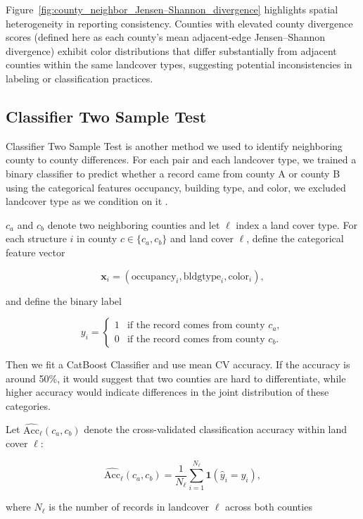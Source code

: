 \documentclass[11pt,letterpaper]{article}
\begin{document}
\noindent


Figure~\ref{fig:county_neighbor_Jensen–Shannon_divergence} highlights spatial heterogeneity in reporting consistency. 
Counties with elevated county divergence scores (defined here as each county's mean adjacent-edge Jensen–Shannon divergence) exhibit color distributions that differ substantially from adjacent counties within the same landcover types, suggesting potential inconsistencies 
in labeling or classification practices.

\subsection{Classifier Two Sample Test}

Classifier Two Sample Test \citep{eum2025c2st} is another method we used to identify neighboring county to county differences. For each pair and each landcover type, we trained a binary classifier to predict whether a record came from county A or county B using the categorical features occupancy, building type, and color, we excluded landcover type as we condition on it \citep{lopezpaz20evisiting}.

$c_a$ and $c_b$ denote two neighboring counties and let $\ell$ index a land cover type. For each structure $i$ in county $c \in \{c_a, c_b\}$ and land cover $\ell$, define the categorical feature vector

\[
\mathbf{x}_i = (\text{occupancy}_i, \text{bldgtype}_i, \text{color}_i),
\]

and define the binary label

\[
y_i =
\begin{cases}
1 & \text{if the record comes from county } c_a, \\
0 & \text{if the record comes from county } c_b.
\end{cases}
\]

Then we fit a CatBoost Classifier \citep{eum2025c2st} and use mean CV accuracy. If the accuracy is around 50\%, it would suggest that two counties are hard to differentiate, while higher accuracy would indicate differences in the joint distribution of these categories. 

Let $\widehat{\text{Acc}}_\ell(c_a, c_b)$ denote the cross-validated classification accuracy within land cover $\ell$:

\[
\widehat{\text{Acc}}_\ell(c_a, c_b)
=
\frac{1}{N_\ell}
\sum_{i=1}^{N_\ell}
\mathbf{1}\!\left(
\widehat{y}_i = y_i
\right),
\]

where $N_\ell$ is the number of records in landcover $\ell$ across both counties
\end{document}
